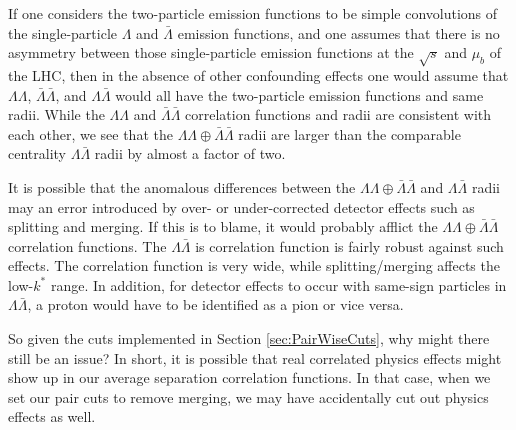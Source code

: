 If one considers the two-particle emission functions to be simple convolutions of the single-particle $\Lambda$ and $\bar{\Lambda}$ emission functions, and one assumes that there is no asymmetry between those single-particle emission functions at the $\sqrt{s}$ and $\mu_b$ of the LHC, then in the absence of other confounding effects one would assume that $\Lambda\Lambda$, $\bar{\Lambda}\bar{\Lambda}$, and $\Lambda\bar{\Lambda}$ would all have the two-particle emission functions and same radii.
While the $\Lambda\Lambda$ and $\bar{\Lambda}\bar{\Lambda}$ correlation functions and radii are consistent with each other, we see that the $\Lambda\Lambda\oplus\bar{\Lambda}\bar{\Lambda}$ radii are larger than the comparable centrality $\Lambda\bar{\Lambda}$ radii by almost a factor of two.

It is possible that the anomalous differences between the $\Lambda\Lambda\oplus\bar{\Lambda}\bar{\Lambda}$ and $\Lambda\bar{\Lambda}$ radii may an error introduced by over- or under-corrected detector effects such as splitting and merging.
If this is to blame, it would probably afflict the $\Lambda\Lambda\oplus\bar{\Lambda}\bar{\Lambda}$ correlation functions.
The $\Lambda\bar{\Lambda}$ is correlation function is fairly robust against such effects. 
The correlation function is very wide, while splitting/merging affects the low-$k^*$ range.
In addition, for detector effects to occur with same-sign particles in $\Lambda\bar{\Lambda}$, a proton would have to be identified as a pion or vice versa.

So given the cuts implemented in Section \ref{sec:PairWiseCuts}, why might there still be an issue?
In short, it is possible that real correlated physics effects might show up in our average separation correlation functions.
In that case, when we set our pair cuts to remove merging, we may have accidentally cut out physics effects as well.


